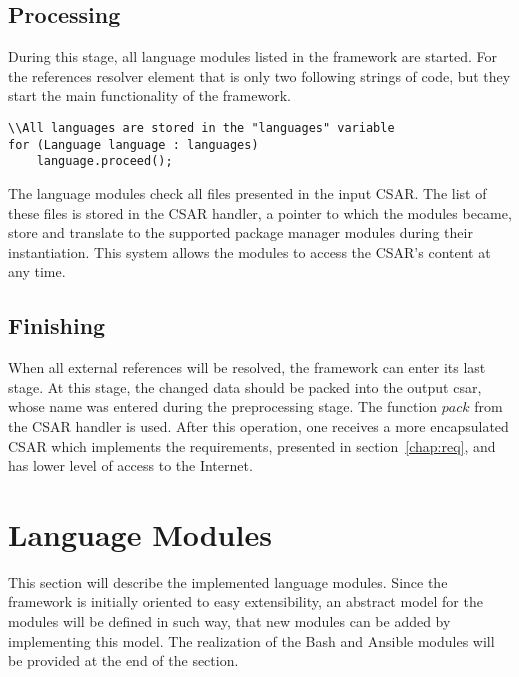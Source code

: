 \subsection*{Processing}
During this stage, all language modules listed in the framework are started.
For the references resolver element that is only two following strings of code, but they start the main functionality of the framework.
\begin{lstlisting}
\\All languages are stored in the "languages" variable
for (Language language : languages)
	language.proceed();
\end{lstlisting}
The language modules check all files presented in the input CSAR. 
The list of these files is stored in the CSAR handler, a pointer to which the modules became, store and translate to the supported package manager modules during their instantiation.
This system allows the modules to access the CSAR's content at any time.


\subsection*{Finishing}
When all external references will be resolved, the framework can enter its last stage.
At this stage, the changed data should be packed into the output \gls{csar}, whose name was entered during the preprocessing stage.
The function $pack$ from the CSAR handler is used. 
After this operation, one receives a more encapsulated CSAR which implements the requirements, presented in section~\ref{chap:req}, and has lower level of access to the Internet.

\section{Language Modules} 
This section will describe the implemented language modules. %
Since the framework is initially oriented to easy extensibility, an abstract model for the modules will be defined in such way, that new modules can be added by implementing this model.
The realization of the Bash and Ansible modules will be provided at the end of the section. %

